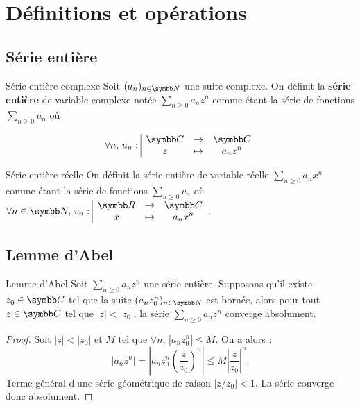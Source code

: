 \section{Définitions et opérations }
\subsection{Série entière }

\begin{definition}{Série entière complexe}{}
    Soit $(a_n)_{n\in\N}$ une suite complexe. On définit la \textbf{série entière} de variable 
    complexe notée $\displaystyle \sum_{n \geqslant 0} a_n z^n$ comme étant la série de fonctions 
    $\displaystyle \sum_{n \geqslant 0} u_n$ où 
    
    $$\forall n, \, \fonction{u_n}{\C}{\C}{z}{a_n z^n}$$
\end{definition}

\begin{definition}{Série entière réelle}{}
    On définit la série entière de variable réelle $\displaystyle \sum_{n \geqslant 0} a_n x^n$ comme étant la série de fonctions
    $\displaystyle \sum_{n \geqslant 0} v_n$ où $\forall n \in \N, \, \fonction{v_n}{\R}{\C}{x}{a_n x^n}$.
\end{definition}

\subsection{Lemme d'Abel}

\begin{proposition}{Lemme d'Abel}{}
    Soit $\sum_{n \geqslant 0 } a_n z^n $ une série entière. Supposons qu'il existe 
    $z_0 \in \C$ tel que la suite $(a_n z_0^n)_{n \in \N}$ est bornée, alors 
    pour tout $z \in \C$ tel que $|z| < |z_0|$, la série $\sum_{n \geqslant 0} a_n z^n$ converge absolument.
\end{proposition}


\begin{proof}
    Soit $|z| < |z_0|$ et $M$ tel que $\forall n, \, |a_n z_0^n| \leqslant M$. On a alors :
    \[
        |a_n z^n| = \left| a_n z_0^n \left( \frac{z}{z_0} \right)^n \right| \leqslant M \left| \frac{z}{z_0} \right|^n.
    \]
    Terme général d'une série géométrique de raison $|z/z_0| < 1$. La série converge donc absolument.
\end{proof}

